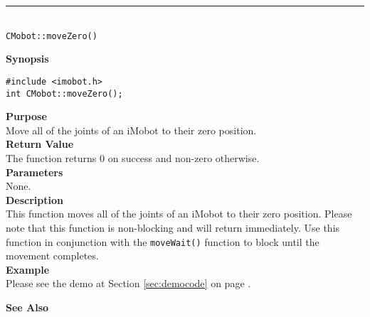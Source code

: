 \noindent
\vspace{5pt}
\rule{4.5in}{0.015in}\\
\noindent
{\LARGE \texttt{CMobot::moveZero()}}\\
{}

\noindent
{\bf Synopsis}\\
\begin{verbatim}
#include <imobot.h>
int CMobot::moveZero();
\end{verbatim}

\noindent
{\bf Purpose}\\
Move all of the joints of an iMobot to their zero position.\\

\noindent
{\bf Return Value}\\
The function returns 0 on success and non-zero otherwise.\\

\noindent
{\bf Parameters}\\
None.\\

\noindent
{\bf Description}\\
This function moves all of the joints of an iMobot to their zero position.
Please note that this function is non-blocking and will return immediately. Use
this function in conjunction with the \texttt{moveWait()} function to block
until the movement completes.\\

\noindent
{\bf Example}\\
Please see the demo at Section \ref{sec:democode} on page \pageref{sec:democode}.\\
\noindent

\noindent
{\bf See Also}\\

